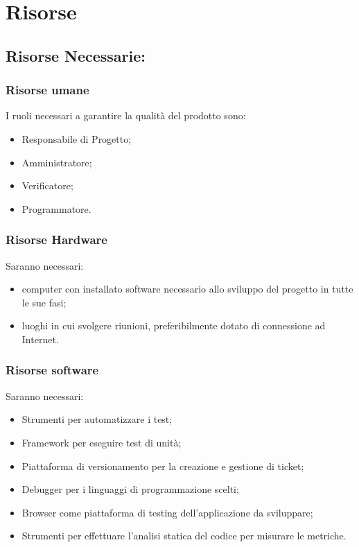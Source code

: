 \section{Risorse}


\subsection{Risorse Necessarie:}


\subsubsection{Risorse umane}

I ruoli necessari a garantire la qualità del prodotto sono:
\begin{itemize}
\item Responsabile di Progetto;
\item Amministratore;
\item Verificatore;
\item Programmatore. 
\end{itemize}

\subsubsection{Risorse Hardware}

Saranno necessari:
\begin{itemize}
\item computer con installato software necessario allo sviluppo del progetto in tutte le sue fasi;
\item luoghi in cui svolgere riunioni, preferibilmente dotato di connessione ad Internet.
\end{itemize}

\subsubsection{Risorse software}

Saranno necessari:
\begin{itemize}
\item Strumenti per automatizzare i test;
\item Framework per eseguire test di unità;
\item Piattaforma di versionamento per la creazione e gestione di ticket;
\item Debugger per i linguaggi di programmazione scelti;
\item Browser come piattaforma di testing dell'applicazione da sviluppare;
\item Strumenti per effettuare l'analisi statica del codice per misurare le metriche.
\end{itemize}


